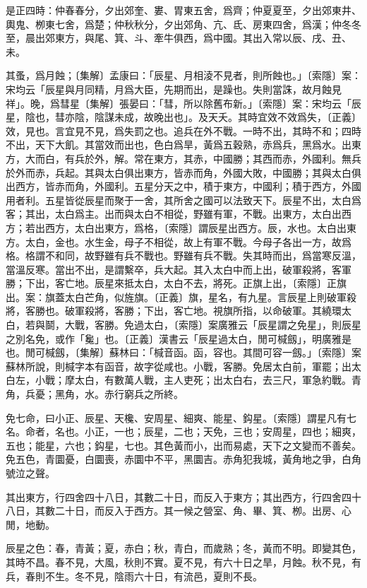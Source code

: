 是正四時：仲春春分，夕出郊奎、婁、胃東五舍，爲齊；仲夏夏至，夕出郊東井、輿鬼、栁東七舍，爲楚；仲秋秋分，夕出郊角、亢、氐、房東四舍，爲漢；仲冬冬至，晨出郊東方，與尾、箕、斗、牽牛俱西，爲中國。其出入常以辰、戌、丑、未。

其蚤，爲月蝕；〔集解〕孟康曰：「辰星、月相淩不見者，則所蝕也。」〔索隱〕案：宋均云「辰星與月同精，月爲大臣，先期而出，是躁也。失則當誅，故月蝕見祥」。晚，爲彗星〔集解〕張晏曰：「彗，所以除舊布新。」〔索隱〕案：宋均云「辰星，陰也，彗亦陰，陰謀未成，故晚出也」。及天夭。其時宜效不效爲失，〔正義〕效，見也。言宜見不見，爲失罰之也。追兵在外不戰。一時不出，其時不和；四時不出，天下大飢。其當效而出也，色白爲旱，黃爲五穀熟，赤爲兵，黑爲水。出東方，大而白，有兵於外，解。常在東方，其赤，中國勝；其西而赤，外國利。無兵於外而赤，兵起。其與太白俱出東方，皆赤而角，外國大敗，中國勝；其與太白俱出西方，皆赤而角，外國利。五星分天之中，積于東方，中國利；積于西方，外國用者利。五星皆從辰星而聚于一舍，其所舍之國可以法致天下。辰星不出，太白爲客；其出，太白爲主。出而與太白不相從，野雖有軍，不戰。出東方，太白出西方；若出西方，太白出東方，爲格，〔索隱〕謂辰星出西方。辰，水也。太白出東方。太白，金也。水生金，母子不相從，故上有軍不戰。今母子各出一方，故爲格。格謂不和同，故野雖有兵不戰也。野雖有兵不戰。失其時而出，爲當寒反溫，當溫反寒。當出不出，是謂繫卒，兵大起。其入太白中而上出，破軍殺將，客軍勝；下出，客亡地。辰星來抵太白，太白不去，將死。正旗上出，〔索隱〕正旗出。案：旗蓋太白芒角，似旌旗。〔正義〕旗，星名，有九星。言辰星上則破軍殺將，客勝也。破軍殺將，客勝；下出，客亡地。視旗所指，以命破軍。其繞環太白，若與鬬，大戰，客勝。免過太白，〔索隱〕案廣雅云「辰星謂之免星」，則辰星之別名免，或作「毚」也。〔正義〕漢書云「辰星過太白，閒可椷劔」，明廣雅是也。閒可椷劔，〔集解〕蘇林曰：「椷音函。函，容也。其間可容一劔。」〔索隱〕案蘇林所說，則椷字本有函音，故字從咸也。小戰，客勝。免居太白前，軍罷；出太白左，小戰；摩太白，有數萬人戰，主人吏死；出太白右，去三尺，軍急約戰。青角，兵憂；黑角，水。赤行窮兵之所終。

免七命，曰小正、辰星、天欃、安周星、細爽、能星、鈎星。〔索隱〕謂星凡有七名。命者，名也。小正，一也；辰星，二也；天免，三也；安周星，四也；細爽，五也；能星，六也；鈎星，七也。其色黃而小，出而易處，天下之文變而不善矣。免五色，青圜憂，白圜喪，赤圜中不平，黑圜吉。赤角犯我城，黃角地之爭，白角號泣之聲。

其出東方，行四舍四十八日，其數二十日，而反入于東方；其出西方，行四舍四十八日，其數二十日，而反入于西方。其一候之營室、角、畢、箕、栁。出房、心閒，地動。

辰星之色：春，青黃；夏，赤白；秋，青白，而歲熟；冬，黃而不明。即變其色，其時不昌。春不見，大風，秋則不實。夏不見，有六十日之旱，月蝕。秋不見，有兵，春則不生。冬不見，陰雨六十日，有流邑，夏則不長。

